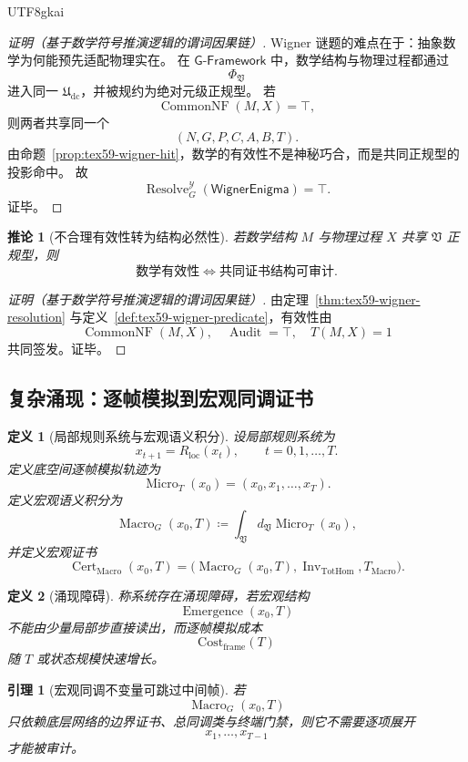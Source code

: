 \documentclass[12pt]{article}
\newtheorem{definition}{定义}[section]
\newtheorem{corollary}{推论}[section]
\newtheorem{lemma}{引理}[section]
\newcommand{\GFramework}{\textsf{G-Framework}}
\newcommand{\Udc}{\mathfrak{U}_{\mathrm{dc}}}
\newcommand{\Vsys}{\mathfrak V}
\newcommand{\DefEq}{\coloneqq}
\DeclareMathOperator{\Cert}{Cert}
\DeclareMathOperator{\Audit}{Audit}
\DeclareMathOperator{\Resolve}{Resolve}
\DeclareMathOperator{\Inv}{Inv}
\DeclareMathOperator{\TotHom}{TotHom}
\DeclareMathOperator{\Macro}{Macro}
\DeclareMathOperator{\Emergence}{Emergence}
\DeclareMathOperator{\Micro}{Micro}
\DeclareMathOperator{\CommonNF}{CommonNF}
\begin{document}
\begin{CJK*}{UTF8}{gkai}
\begin{proof}[证明（基于数学符号推演逻辑的谓词因果链）]
Wigner 谜题的难点在于：抽象数学为何能预先适配物理实在。
在 \(\GFramework{}\) 中，数学结构与物理过程都通过
\[
  \Phi_{\Vsys}
\]
进入同一 \(\Udc\)，并被规约为绝对元级正规型。
若
\[
  \CommonNF(M,X)=\top,
\]
则两者共享同一个
\[
  (N,G,P,C,A,B,T).
\]
由命题~\ref{prop:tex59-wigner-hit}，数学的有效性不是神秘巧合，而是共同正规型的投影命中。
故
\[
  \Resolve_G^{\mathcal Y}(\mathsf{WignerEnigma})=\top.
\]
证毕。
\end{proof}

\begin{corollary}[不合理有效性转为结构必然性]
\label{cor:tex59-wigner-necessity}
若数学结构 \(M\) 与物理过程 \(X\) 共享 \(\Vsys\) 正规型，则
\[
  \text{数学有效性}
  \Longleftrightarrow
  \text{共同证书结构可审计}.
\]
\end{corollary}

\begin{proof}[证明（基于数学符号推演逻辑的谓词因果链）]
由定理~\ref{thm:tex59-wigner-resolution} 与定义~\ref{def:tex59-wigner-predicate}，有效性由
\[
  \CommonNF(M,X),\quad \Audit=\top,\quad T(M,X)=1
\]
共同签发。证毕。
\end{proof}

\subsection{复杂涌现：逐帧模拟到宏观同调证书}
\label{subsec:tex59-emergence}

\begin{definition}[局部规则系统与宏观语义积分]
\label{def:tex59-emergence-system}
设局部规则系统为
\[
  x_{t+1}=R_{\mathrm{loc}}(x_t),
  \qquad t=0,1,\ldots,T.
\]
定义底空间逐帧模拟轨迹为
\[
  \Micro_T(x_0)
  =
  (x_0,x_1,\ldots,x_T).
\]
定义宏观语义积分为
\[
  \Macro_G(x_0,T)
  \DefEq
  \int_{\Vsys} d_{\Vsys}\Micro_T(x_0),
\]
并定义宏观证书
\[
  \Cert_{\Macro}(x_0,T)
  =
  \bigl(\Macro_G(x_0,T),\Inv_{\TotHom},T_{\Macro}\bigr).
\]
\end{definition}

\begin{definition}[涌现障碍]
\label{def:tex59-emergence-obstruction}
称系统存在涌现障碍，若宏观结构
\[
  \Emergence(x_0,T)
\]
不能由少量局部步直接读出，而逐帧模拟成本
\[
  \mathrm{Cost}_{\mathrm{frame}}(T)
\]
随 \(T\) 或状态规模快速增长。
\end{definition}

\begin{lemma}[宏观同调不变量可跳过中间帧]
\label{lem:tex59-macro-invariant-skip}
若
\[
  \Macro_G(x_0,T)
\]
只依赖底层网络的边界证书、总同调类与终端门禁，则它不需要逐项展开
\[
  x_1,\ldots,x_{T-1}
\]
才能被审计。
\end{lemma}


\end{CJK*}
\end{document}
